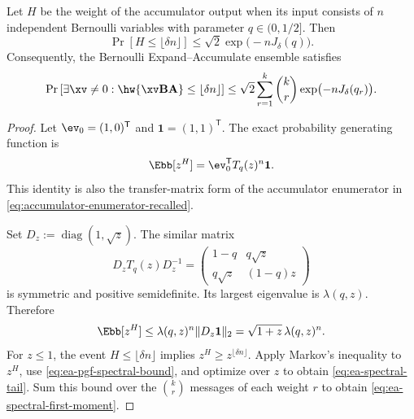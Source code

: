 \begin{lemma}
\label{lem:ea-spectral-tail}
Let $H$ be the weight of the accumulator output when its input consists of
$n$ independent Bernoulli variables with parameter $q\in(0,1/2]$.  Then
\begin{equation}
 \Pr[H\leq\lfloor\delta n\rfloor]
 \leq \sqrt{2}\exp\bigl(-nJ_\delta(q)\bigr).
 \label{eq:ea-spectral-tail}
\end{equation}
Consequently, the Bernoulli Expand--Accumulate ensemble satisfies
\begin{equation}
 \Pr\left[\exists\xv\neq 0:
   \hw{\xv\B\A}\leq\lfloor\delta n\rfloor\right]
 \leq
 \sqrt{2}\sum_{r=1}^{k}\binom{k}{r}
 \exp\bigl(-nJ_\delta(q_r)\bigr).
 \label{eq:ea-spectral-first-moment}
\end{equation}
\end{lemma}

\begin{proof}
Let $\ev_0=(1,0)^{\mathsf T}$ and $\boldsymbol{1}=(1,1)^{\mathsf T}$.  The exact
probability generating function is
\begin{equation}
 \Ebb[z^H]=\ev_0^{\mathsf T}T_q(z)^n\boldsymbol{1}.
 \label{eq:ea-output-pgf}
\end{equation}
This identity is also the transfer-matrix form of the accumulator enumerator
in \eqref{eq:accumulator-enumerator-recalled}.

Set $D_z:=\operatorname{diag}(1,\sqrt z)$.  The similar matrix
\begin{equation}
 D_zT_q(z)D_z^{-1}
 =
 \begin{pmatrix}
  1-q & q\sqrt z\\
  q\sqrt z & (1-q)z
 \end{pmatrix}
 \label{eq:ea-symmetric-matrix}
\end{equation}
is symmetric and positive semidefinite.  Its largest eigenvalue is
$\lambda(q,z)$.  Therefore
\begin{equation}
 \Ebb[z^H]
 \leq \lambda(q,z)^n\lVert D_z\boldsymbol{1}\rVert_2
 =\sqrt{1+z}\,\lambda(q,z)^n.
 \label{eq:ea-pgf-spectral-bound}
\end{equation}
For $z\leq 1$, the event $H\leq\lfloor\delta n\rfloor$ implies
$z^H\geq z^{\lfloor\delta n\rfloor}$.  Apply Markov's inequality to
$z^H$, use \eqref{eq:ea-pgf-spectral-bound}, and optimize over $z$ to obtain
\eqref{eq:ea-spectral-tail}.  Sum this bound over the
$\binom{k}{r}$ messages of each weight $r$ to obtain
\eqref{eq:ea-spectral-first-moment}.
\end{proof}


